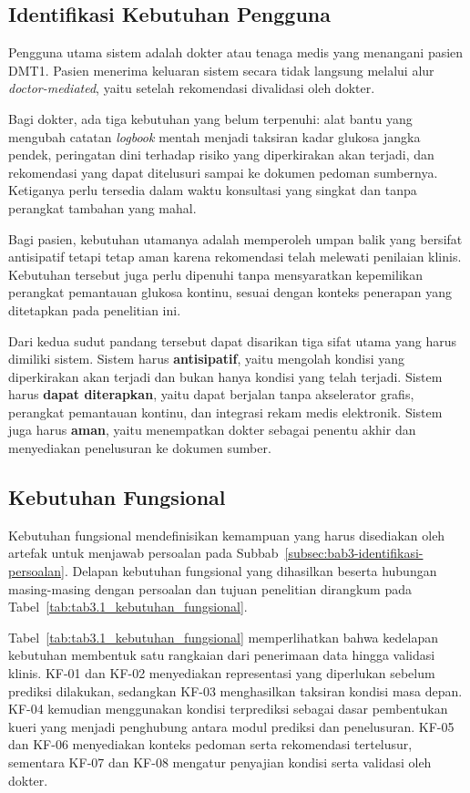 \subsection{Identifikasi Kebutuhan Pengguna}
\label{subsec:bab3-identifikasi-kebutuhan-pengguna}
Pengguna utama sistem adalah dokter atau tenaga medis yang menangani pasien DMT1. Pasien menerima keluaran sistem secara tidak langsung melalui alur \textit{doctor-mediated}, yaitu
setelah rekomendasi divalidasi oleh dokter.

Bagi dokter, ada tiga kebutuhan yang belum terpenuhi: alat bantu yang mengubah catatan \textit{logbook} mentah menjadi taksiran kadar glukosa jangka pendek, peringatan dini
terhadap risiko yang diperkirakan akan terjadi, dan rekomendasi yang dapat ditelusuri sampai ke dokumen pedoman sumbernya. Ketiganya perlu tersedia dalam waktu konsultasi
yang singkat dan tanpa perangkat tambahan yang mahal.

Bagi pasien, kebutuhan utamanya adalah memperoleh umpan balik yang bersifat antisipatif tetapi tetap aman karena rekomendasi telah melewati penilaian klinis. Kebutuhan tersebut juga
perlu dipenuhi tanpa mensyaratkan kepemilikan perangkat pemantauan glukosa kontinu, sesuai dengan konteks penerapan yang ditetapkan pada penelitian ini.

Dari kedua sudut pandang tersebut dapat disarikan tiga sifat utama yang harus dimiliki sistem. Sistem harus \textbf{antisipatif}, yaitu mengolah kondisi yang diperkirakan akan terjadi
dan bukan hanya kondisi yang telah terjadi. Sistem harus \textbf{dapat diterapkan}, yaitu dapat berjalan tanpa akselerator grafis, perangkat pemantauan kontinu, dan integrasi rekam
medis elektronik. Sistem juga harus \textbf{aman}, yaitu menempatkan dokter sebagai penentu akhir dan menyediakan penelusuran ke dokumen sumber.

\subsection{Kebutuhan Fungsional}
\label{subsec:bab3-kebutuhan-fungsional}
Kebutuhan fungsional mendefinisikan kemampuan yang harus disediakan oleh artefak untuk menjawab persoalan pada Subbab~\ref{subsec:bab3-identifikasi-persoalan}. Delapan kebutuhan
fungsional yang dihasilkan beserta hubungan masing-masing dengan persoalan dan tujuan penelitian dirangkum pada Tabel~\ref{tab:tab3.1_kebutuhan_fungsional}.



Tabel~\ref{tab:tab3.1_kebutuhan_fungsional} memperlihatkan bahwa kedelapan kebutuhan membentuk satu rangkaian dari penerimaan data hingga validasi klinis. KF-01 dan KF-02 menyediakan
representasi yang diperlukan sebelum prediksi dilakukan, sedangkan KF-03 menghasilkan taksiran kondisi masa depan. KF-04 kemudian menggunakan kondisi terprediksi sebagai dasar
pembentukan kueri yang menjadi penghubung antara modul prediksi dan penelusuran. KF-05 dan KF-06 menyediakan konteks pedoman serta rekomendasi tertelusur, sementara KF-07 dan KF-08
mengatur penyajian kondisi serta validasi oleh dokter.

